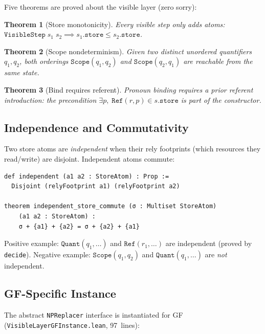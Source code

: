 \documentclass[11pt]{article}
\newtheorem{theorem}{Theorem}
\newcommand{\code}[1]{\texttt{#1}}
\newcommand{\GF}{\textup{GF}}
\begin{document}
Five theorems are proved about the visible layer (zero sorry):

\begin{theorem}[Store monotonicity]
Every visible step only adds atoms:
$\code{VisibleStep}\; s_1\; s_2 \implies s_1.\code{store} \le
s_2.\code{store}$.
\end{theorem}

\begin{theorem}[Scope nondeterminism]
Given two distinct unordered quantifiers $q_1, q_2$, both orderings
$\code{Scope}(q_1, q_2)$ and $\code{Scope}(q_2, q_1)$ are reachable
from the same state.
\end{theorem}

\begin{theorem}[Bind requires referent]
Pronoun binding requires a prior referent introduction:
the precondition $\exists p,\; \code{Ref}(r, p) \in s.\code{store}$
is part of the constructor.
\end{theorem}

\subsection{Independence and Commutativity}

Two store atoms are \emph{independent} when their rely footprints
(which resources they read/write) are disjoint.  Independent atoms commute:

\begin{lstlisting}[language=ml,caption={Independence via rely footprints}]
def independent (a1 a2 : StoreAtom) : Prop :=
  Disjoint (relyFootprint a1) (relyFootprint a2)

theorem independent_store_commute (σ : Multiset StoreAtom)
    (a1 a2 : StoreAtom) :
    σ + {a1} + {a2} = σ + {a2} + {a1}
\end{lstlisting}

\noindent Positive example: $\code{Quant}(q_1, \ldots)$ and
$\code{Ref}(r_1, \ldots)$ are independent (proved by \code{decide}).
Negative example: $\code{Scope}(q_1, q_2)$ and
$\code{Quant}(q_1, \ldots)$ are \emph{not} independent.

\subsection{GF-Specific Instance}

The abstract \code{NPReplacer} interface is instantiated for \GF{}
(\code{VisibleLayerGFInstance.lean}, 97~lines):
\end{document}
